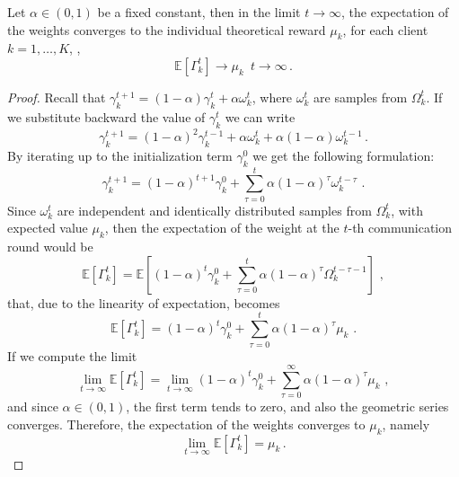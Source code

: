 \begin{theorem}\label{thm:weak_conv}
Let $\alpha \in (0,1)$ be a fixed constant, then in the limit $t \to \infty$, the expectation of the weights converges to the individual theoretical reward $\mu_k$, for each client $k = 1,\dots, K$, \ie,
\begin{equation}
    \mathbb{E}[\Gamma_k^t]\longrightarrow \mu_k\,\,\,t\to\infty\,.
\end{equation}
\end{theorem}
\begin{proof}
Recall that $\gamma_k^{t+1} = (1-\alpha)\gamma_k^t + \alpha \omega_k^t$, where $\omega_k^t$ are samples from $\Omega_k^t$. If we substitute backward the value of $\gamma_k^t$ we can write
\begin{equation}
\gamma_k^{t+1} = (1-\alpha)^2\gamma_k^{t-1} + \alpha \omega_k^t + \alpha(1-\alpha)\omega_k^{t-1}\,.
\end{equation}
By iterating up to the initialization term $\gamma_k^0$ we get the following formulation: 
\begin{equation}\label{explicit}
    \gamma_k^{t+1} = (1-\alpha)^{t+1} \gamma_k^0+ \sum_{\tau = 0}^t \alpha (1-\alpha)^\tau \omega_k^{t-\tau}\,\,.
\end{equation}
Since $\omega_k^t$ are independent and identically distributed samples from $\Omega_k^t$, with expected value $\mu_k$, then the expectation of the weight at the $t$-th communication round would be
\begin{equation}
    \mathbb{E}[\Gamma_k^{t}] = \mathbb{E}\left[(1-\alpha)^{t}\gamma_k^0 + \sum_{\tau = 0}^t \alpha (1-\alpha)^\tau \Omega_k^{t-\tau-1}\right ]\,\,,
\end{equation}
that, due to the linearity of expectation, becomes
\begin{equation}
    \mathbb{E}[\Gamma_k^{t}] = (1-\alpha)^{t}\gamma_k^0 + \sum_{\tau = 0}^t \alpha (1-\alpha)^\tau \mu_k\,\,.
\end{equation}
If we compute the limit
\begin{equation}
    \lim_{t \to \infty}\mathbb{E}[\Gamma_k^{t}] =\lim_{t\to\infty}(1-\alpha)^{t}\gamma_k^0 + \sum_{\tau = 0}^\infty \alpha (1-\alpha)^\tau \mu_k\,\,,
\end{equation}
and since $\alpha\in(0,1)$, the first term tends to zero, and also the geometric series converges. Therefore, the expectation of the weights converges to $\mu_k$, namely
\begin{equation}
    \lim_{t \to \infty} \mathbb{E}[\Gamma_k^t] = \mu_k\,.
\end{equation}
\end{proof}

